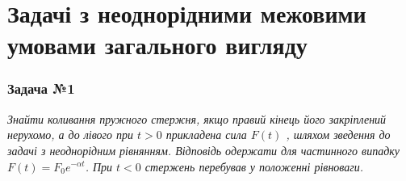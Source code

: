 \documentclass[a4paper, 14pt]{extreport}
\begin{document}
\section{Задачі з неоднорідними межовими умовами загального вигляду}

\subsubsection{Задача №1}

\textit{Знайти коливання пружного стержня, якщо правий кінець його закріплений нерухомо, а до лівого при $t > 0$ прикладена сила $F(t)$ , шляхом зведення до задачі з неоднорідним рівнянням. Відповідь одержати для частинного випадку $F(t) = F_0 e^{-\alpha t}$. При $t < 0$ стержень перебував у положенні рівноваги.}
\end{document}
